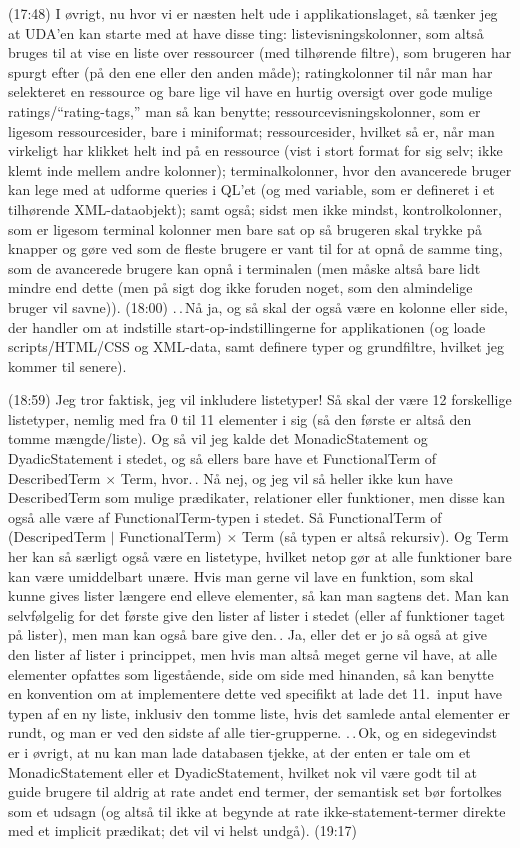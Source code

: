 \documentclass{report}
\begin{document}
(17:48) I øvrigt, nu hvor vi er næsten helt ude i applikationslaget, så tænker jeg at UDA'en kan starte med at have disse ting: listevisningskolonner, som altså bruges til at vise en liste over ressourcer (med tilhørende filtre), som brugeren har spurgt efter (på den ene eller den anden måde); ratingkolonner til når man har selekteret en ressource og bare lige vil have en hurtig oversigt over gode mulige ratings/``rating-tags,'' man så kan benytte; ressourcevisningskolonner, som er ligesom ressourcesider, bare i miniformat; ressourcesider, hvilket så er, når man virkeligt har klikket helt ind på en ressource (vist i stort format for sig selv; ikke klemt inde mellem andre kolonner); terminalkolonner, hvor den avancerede bruger kan lege med at udforme queries i QL'et (og med variable, som er defineret i et tilhørende XML-dataobjekt); samt også; sidst men ikke mindst, kontrolkolonner, som er ligesom terminal kolonner men bare sat op så brugeren skal trykke på knapper og gøre ved som de fleste brugere er vant til for at opnå de samme ting, som de avancerede brugere kan opnå i terminalen (men måske altså bare lidt mindre end dette (men på sigt dog ikke foruden noget, som den almindelige bruger vil savne)). (18:00) .\,.\,Nå ja, og så skal der også være en kolonne eller side, der handler om at indstille start-op-indstillingerne for applikationen (og loade scripts/HTML/CSS og XML-data, samt definere typer og grundfiltre, hvilket jeg kommer til senere). 

(18:59) Jeg tror faktisk, jeg vil inkludere listetyper! Så skal der være 12 forskellige listetyper, nemlig med fra 0 til 11 elementer i sig (så den første er altså den tomme mængde/liste). Og så vil jeg kalde det MonadicStatement og DyadicStatement i stedet, og så ellers bare have et FunctionalTerm of DescribedTerm $\times$ Term, hvor.\,. Nå nej, og jeg vil så heller ikke kun have DescribedTerm som mulige prædikater, relationer eller funktioner, men disse kan også alle være af FunctionalTerm-typen i stedet. Så FunctionalTerm of (DescripedTerm  $|$ FunctionalTerm) $\times$ Term (så typen er altså rekursiv). Og Term her kan så særligt også være en listetype, hvilket netop gør at alle funktioner bare kan være umiddelbart unære. Hvis man gerne vil lave en funktion, som skal kunne gives lister længere end elleve elementer, så kan man sagtens det. Man kan selvfølgelig for det første give den lister af lister i stedet (eller af funktioner taget på lister), men man kan også bare give den.\,. Ja, eller det er jo så også at give den lister af lister i princippet, men hvis man altså meget gerne vil have, at alle elementer opfattes som ligestående, side om side med hinanden, så kan benytte en konvention om at implementere dette ved specifikt at lade det 11.\ input have typen af en ny liste, inklusiv den tomme liste, hvis det samlede antal elementer er rundt, og man er ved den sidste af alle tier-grupperne. .\,.\,Ok, og en sidegevindst er i øvrigt, at nu kan man lade databasen tjekke, at der enten er tale om et MonadicStatement eller et DyadicStatement, hvilket nok vil være godt til at guide brugere til aldrig at rate andet end termer, der semantisk set bør fortolkes som et udsagn (og altså til ikke at begynde at rate ikke-statement-termer direkte med et implicit prædikat; det vil vi helst undgå). (19:17)
\end{document}
